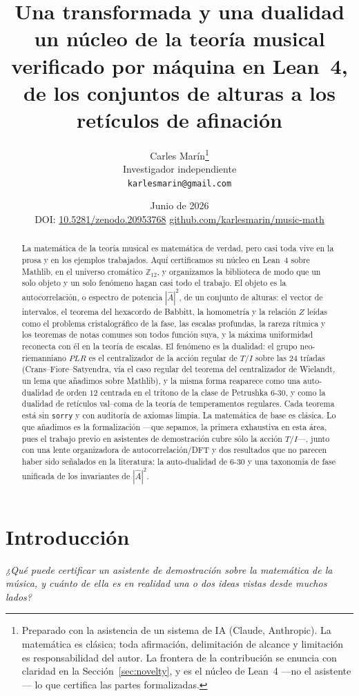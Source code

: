\documentclass[11pt]{article}
\title{\bf Una transformada y una dualidad\\[5pt]
  \large\rm un núcleo de la teoría musical verificado por máquina en Lean~4,\\
  de los conjuntos de alturas a los retículos de afinación}
\author{Carles Mar\'in\thanks{Preparado con la asistencia de un sistema de IA (Claude, Anthropic).
La matemática es clásica; toda afirmación, delimitación de alcance y limitación es responsabilidad del
autor. La frontera de la contribución se enuncia con claridad en la Sección~\ref{sec:novelty}, y es el
núcleo de Lean~4 ---no el asistente--- lo que certifica las partes formalizadas.}\\[3pt]
  \normalsize Investigador independiente\\
  \normalsize \texttt{karlesmarin@gmail.com}}
\date{Junio de 2026\\[3pt]\normalsize DOI: \href{https://doi.org/10.5281/zenodo.20953768}{10.5281/zenodo.20953768}\quad\textbullet\quad
  \href{https://github.com/karlesmarin/music-math}{github.com/karlesmarin/music-math}}
\newcommand{\lean}[1]{\texttt{#1}}
\newcommand{\Ztwelve}{\mathbb{Z}_{12}}
\newcommand{\Ahat}{\hat{A}}
\newcommand{\question}[1]{\smallskip\noindent\textit{#1}\smallskip}
\begin{document}
\maketitle

\begin{abstract}\noindent
La matemática de la teoría musical es matemática de verdad, pero casi toda vive en la prosa y en los
ejemplos trabajados. Aquí certificamos su núcleo en Lean~4 sobre Mathlib, en el universo cromático
$\Ztwelve$, y organizamos la biblioteca de modo que un solo objeto y un solo fenómeno hagan casi todo el
trabajo. El objeto es la autocorrelación, o espectro de potencia $|\Ahat|^2$, de un conjunto de alturas:
el vector de intervalos, el teorema del hexacordo de Babbitt, la homometría y la relación $Z$ leídas como
el problema cristalográfico de la fase, las escalas profundas, la rareza rítmica y los teoremas de notas
comunes son todos función suya, y la máxima uniformidad reconecta con él en la teoría de escalas. El
fenómeno es la dualidad: el grupo neo-riemanniano $PLR$ es el centralizador de la acción regular de $T/I$
sobre las $24$ tríadas (Crans--Fiore--Satyendra, vía el caso regular del teorema del centralizador de
Wielandt, un lema que añadimos sobre Mathlib), y la misma forma reaparece como una auto-dualidad de orden
$12$ centrada en el tritono de la clase de Petrushka $6$-$30$, y como la dualidad de retículos val--coma
de la teoría de temperamentos regulares. Cada teorema está sin \lean{sorry} y con auditoría de axiomas
limpia. La matemática de base es clásica. Lo que añadimos es la formalización ---que sepamos, la primera
exhaustiva en esta área, pues el trabajo previo en asistentes de demostración cubre sólo la acción
$T/I$---, junto con una lente organizadora de autocorrelación/DFT y dos resultados que no parecen haber
sido señalados en la literatura: la auto-dualidad de 6-30 y una taxonomía de fase unificada de los
invariantes de $|\Ahat|^2$.
\end{abstract}

\section{Introducción}\label{sec:intro}

\question{¿Qué puede certificar un asistente de demostración sobre la matemática de la música, y cuánto de
ella es en realidad una o dos ideas vistas desde muchos lados?}
\end{document}
